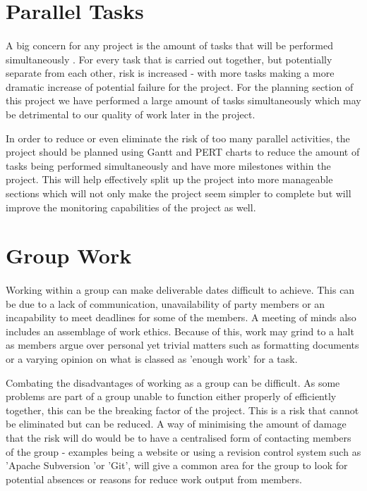 
\section{Parallel Tasks}
\paragraph{}

A big concern for any project is the amount of tasks that will be performed
simultaneously \cite{OracleWP}.
For every task that is carried out together, but potentially
separate from each other, risk is increased - with more tasks making a more
dramatic increase of potential failure for the project.  For the planning
section of this project we have performed a large amount of tasks simultaneously
which may be detrimental to our quality of work later in the project.

In order to reduce or even eliminate the risk of too many parallel activities,
the project should be planned using Gantt and PERT charts to reduce the amount
of tasks being performed simultaneously and have more milestones within the
project.  This will help effectively split up the project into more manageable
sections which will not only make the project seem simpler to complete but will
improve the monitoring capabilities of the project as well.

\section{Group Work}
\paragraph{}

Working within a group can make deliverable dates difficult to achieve.  This
can be due to a lack of communication, unavailability of party members or an
incapability to meet deadlines for some of the members.  A meeting of minds also
includes an assemblage of work ethics.  Because of this, work may grind to a
halt as members argue over personal yet trivial matters such as formatting
documents or a varying opinion on what is classed as 'enough work' for a task.

Combating the disadvantages of working as a group can be difficult.  As some
problems are part of a group unable to function either properly of efficiently
together, this can be the breaking factor of the project.  This is a risk that
cannot be eliminated but can be reduced.  A way of minimising the amount of
damage that the risk will do would be to have a centralised form of contacting
members of the group - examples being a website or using a revision control
system such as 'Apache Subversion 'or 'Git', will give a common area for the
group to look for potential absences or reasons for reduce work output from
members. 


